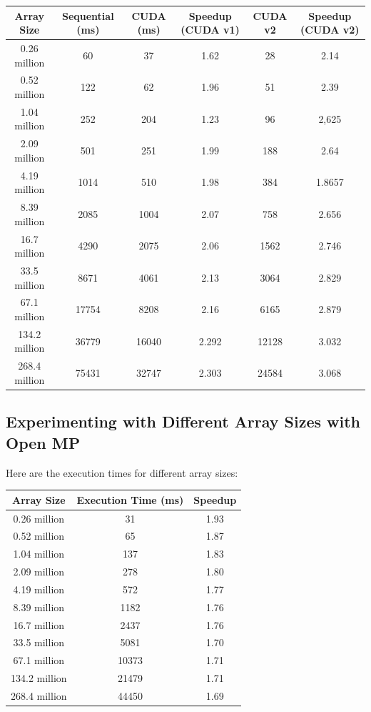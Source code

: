 \documentclass{article}
\begin{document}
\begin{center}
  \begin{tabular}{|c|c|c|c|c|c|}
    \hline
    \textbf{Array Size} & \textbf{Sequential (ms)} & \textbf{CUDA (ms)} & \textbf{Speedup (CUDA v1)} & \textbf{CUDA v2} & \textbf{Speedup (CUDA v2)}\\
    \hline

    0.26 million & 60 & 37 & 1.62 & 28 & 2.14 \\
    0.52 million & 122 & 62 & 1.96 & 51 & 2.39 \\ 
    1.04 million & 252 & 204 & 1.23 & 96 & 2,625 \\
    2.09 million & 501 & 251 & 1.99 & 188 & 2.64 \\
    4.19 million & 1014 & 510 & 1.98 & 384 & 1.8657 \\
    8.39 million & 2085 & 1004 & 2.07 & 758 & 2.656 \\
    16.7 million & 4290 & 2075 & 2.06 & 1562 & 2.746 \\
    33.5 million & 8671 & 4061 & 2.13 & 3064 & 2.829 \\
    67.1 million & 17754 & 8208 & 2.16 & 6165 & 2.879 \\
    134.2 million & 36779 & 16040 & 2.292 & 12128 & 3.032 \\
    268.4 million & 75431 & 32747 & 2.303 & 24584 & 3.068 \\
    
    \hline
  \end{tabular}
\end{center}

\subsection*{Experimenting with Different Array Sizes with Open MP}

Here are the execution times for different array sizes:

\begin{center}
  \begin{tabular}{|c|c|c|}
    \hline
    \textbf{Array Size} & \textbf{Execution Time (ms)} & \textbf{Speedup} \\
    \hline

    0.26 million & 31 & 1.93 \\
    0.52 million & 65 & 1.87 \\
    1.04 million & 137 & 1.83 \\
    2.09 million & 278 & 1.80 \\
    4.19 million & 572 & 1.77 \\
    8.39 million & 1182 & 1.76 \\
    16.7 million & 2437 & 1.76 \\
    33.5 million & 5081 & 1.70 \\
    67.1 million & 10373 & 1.71 \\
    134.2 million & 21479 & 1.71 \\
    268.4 million & 44450 & 1.69 \\
    
    \hline
  \end{tabular}
\end{center}
\end{document}
